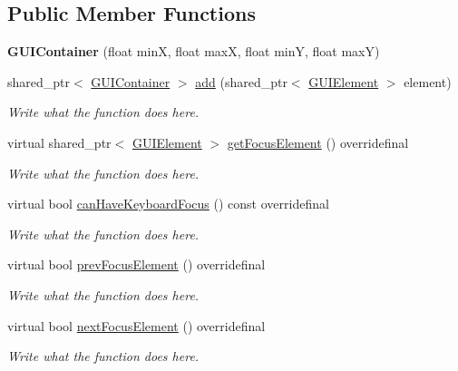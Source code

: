 \subsection*{Public Member Functions}
\begin{DoxyCompactItemize}
\item 
\hypertarget{classGUIContainer_aa35797f8b9c6a8e332ad5930faa69c00}{{\bfseries G\+U\+I\+Container} (float min\+X, float max\+X, float min\+Y, float max\+Y)}\label{classGUIContainer_aa35797f8b9c6a8e332ad5930faa69c00}

\item 
shared\+\_\+ptr$<$ \hyperlink{classGUIContainer}{G\+U\+I\+Container} $>$ \hyperlink{classGUIContainer_a01f2cf647a23b37ed7d815a9780ef8f9}{add} (shared\+\_\+ptr$<$ \hyperlink{classGUIElement}{G\+U\+I\+Element} $>$ element)
\begin{DoxyCompactList}\small\item\em Write what the function does here. \end{DoxyCompactList}\item 
virtual shared\+\_\+ptr$<$ \hyperlink{classGUIElement}{G\+U\+I\+Element} $>$ \hyperlink{classGUIContainer_addf987ba650075a7c0f34c571debd6a2}{get\+Focus\+Element} () overridefinal
\begin{DoxyCompactList}\small\item\em Write what the function does here. \end{DoxyCompactList}\item 
virtual bool \hyperlink{classGUIContainer_a54bbf86cc92ce6518ccdc25a21b8e5f5}{can\+Have\+Keyboard\+Focus} () const overridefinal
\begin{DoxyCompactList}\small\item\em Write what the function does here. \end{DoxyCompactList}\item 
virtual bool \hyperlink{classGUIContainer_afa186df2611c4e309094e8da2654f5b2}{prev\+Focus\+Element} () overridefinal
\begin{DoxyCompactList}\small\item\em Write what the function does here. \end{DoxyCompactList}\item 
virtual bool \hyperlink{classGUIContainer_a83c20737ae89ecdb0da054cec1ca087e}{next\+Focus\+Element} () overridefinal
\begin{DoxyCompactList}\small\item\em Write what the function does here. \end{DoxyCompactList}\item 

\end{DoxyCompactItemize}
